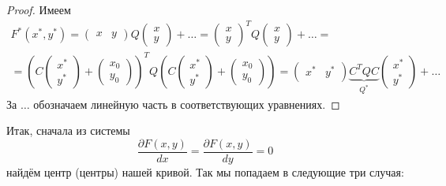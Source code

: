 \begin{proof}
    Имеем
    $$
    \begin{array}{c}\displaystyle
        F^\ast(x^\ast, y^\ast) =
        \begin{pmatrix}
            x & y
        \end{pmatrix}Q
        \begin{pmatrix}
            x\\ y
        \end{pmatrix} + \ldots =
        \begin{pmatrix}
            x\\ y
        \end{pmatrix}^T
        Q
        \begin{pmatrix}
            x\\ y
        \end{pmatrix} + \ldots = {}\\\displaystyle {} = 
        \left(
            C
            \begin{pmatrix}
                x^\ast\\ y^\ast
            \end{pmatrix}
            +
            \begin{pmatrix}
                x_0\\ y_0
            \end{pmatrix}
        \right)^TQ
        \left(
            C
            \begin{pmatrix}
                x^\ast\\ y^\ast
            \end{pmatrix}
            +
            \begin{pmatrix}
                x_0\\ y_0
            \end{pmatrix}
        \right) =
        \begin{pmatrix}
            x^\ast & y^\ast
        \end{pmatrix}\underbrace{C^TQC}_{Q^\ast}
        \begin{pmatrix}
            x^\ast\\ y^\ast
        \end{pmatrix} + \ldots
    \end{array}
    $$
    За $\ldots$ обозначаем линейную часть в соответствующих уравнениях.
\end{proof}

Итак, сначала из системы
$$
\frac{\partial F(x, y)}{dx} = \frac{\partial F(x, y)}{dy} = 0
$$
найдём центр (центры) нашей кривой. Так мы попадаем в следующие три случая:


